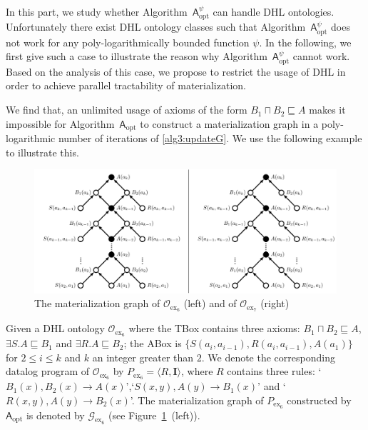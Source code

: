 In this part, we study whether Algorithm~$\mathsf{A}_{\text{opt}}^\psi$ can handle DHL ontologies.
Unfortunately there exist DHL ontology classes such that Algorithm~$\mathsf{A}_{\text{opt}}^\psi$
does not work for any poly-lo\-ga\-rith\-mi\-cal\-ly bounded function $\psi$.
In the following, we first give such a case
to illustrate the reason why Algorithm~$\mathsf{A}_{\text{opt}}^\psi$ cannot work.
Based on the analysis of this case, we propose to restrict
the usage of DHL in order to achieve parallel tractability
of materialization.

We find that, an unlimited usage of axioms of the
form $B_1\sqcap B_2\sqsubseteq A$
makes it impossible for Algorithm~$\mathsf{A}_{\text{opt}}$ to construct a materialization graph
in a poly-logarithmic number of iterations of \ref{alg3:updateG}.
We use the following example to illustrate this.

\begin{figure}[htbp]
\begin{center}
\includegraphics[width=\textwidth]{fig-pathtwist.pdf}
\caption{The materialization graph of $\mathcal{O}_{\text{ex}_6}$
  (left) and of $\mathcal{O}_{\text{ex}_7}$ (right)}
\label{fig:ex3_4}
\end{center}
\end{figure}

\begin{example}\label{exp:dhl}
Given a DHL ontology $\mathcal{O}_{\text{ex}_6}$ where the TBox contains three axioms:
$B_1\sqcap B_2\sqsubseteq A$, $\exists S.A\sqsubseteq B_1$ and $\exists R.A\sqsubseteq B_2$;
the ABox is $\{S(a_i,a_{i-1}), R(a_i,a_{i-1}), A(a_1)\}$
for $2\leq i\leq k$ and $k$ an integer greater than $2$.
We denote the corresponding datalog program of $\mathcal{O}_{\text{ex}_6}$ by $P_{\text{ex}_6}=\langle R, \textbf{I}\rangle$,
where $R$ contains three rules: `$B_1(x),B_2(x)\rightarrow A(x)$',`$S(x,y),A(y)\rightarrow B_1(x)$' and `$R(x,y),A(y)\rightarrow B_2(x)$'.
The materialization graph of $P_{\text{ex}_6}$ constructed by
$\mathsf{A}_{\text{opt}}$ is denoted by $\mathcal{G}_{\text{ex}_6}$
(see Figure~\ref{fig:ex3_4}~(left)).
\end{example}

